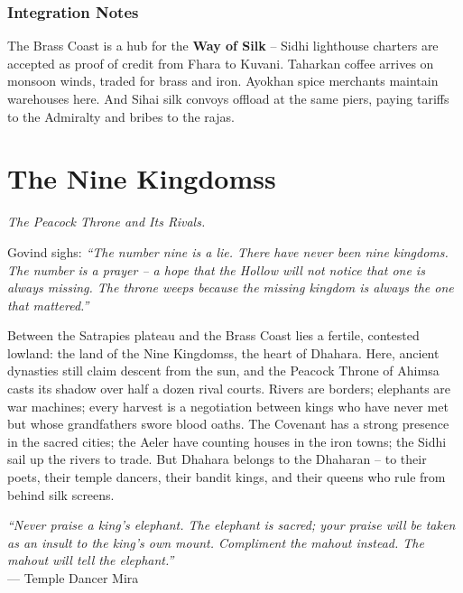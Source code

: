 \documentclass[12pt,oneside]{book}
\begin{document}
\subsection*{Integration Notes}
The Brass Coast is a hub for the \textbf{Way of Silk} -- Sidhi lighthouse charters are accepted as proof of credit from Fhara to Kuvani. Taharkan coffee arrives on monsoon winds, traded for brass and iron. Ayokhan spice merchants maintain warehouses here. And Sihai silk convoys offload at the same piers, paying tariffs to the Admiralty and bribes to the rajas.

\newpage

\newpage

\chapter{The Nine Kingdomss}
\emph{The Peacock Throne and Its Rivals.}

\noindent
Govind sighs: \textit{``The number nine is a lie. There have never been nine kingdoms. The number is a prayer -- a hope that the Hollow will not notice that one is always missing. The throne weeps because the missing kingdom is always the one that mattered.''}

\noindent
Between the Satrapies plateau and the Brass Coast lies a fertile, contested lowland: the land of the Nine Kingdomss, the heart of Dhahara. Here, ancient dynasties still claim descent from the sun, and the Peacock Throne of Ahimsa casts its shadow over half a dozen rival courts. Rivers are borders; elephants are war machines; every harvest is a negotiation between kings who have never met but whose grandfathers swore blood oaths. The Covenant has a strong presence in the sacred cities; the Aeler have counting houses in the iron towns; the Sidhi sail up the rivers to trade. But Dhahara belongs to the Dhaharan -- to their poets, their temple dancers, their bandit kings, and their queens who rule from behind silk screens.

\vspace{0.5em}
\noindent\textit{``Never praise a king's elephant. The elephant is sacred; your praise will be taken as an insult to the king's own mount. Compliment the mahout instead. The mahout will tell the elephant.''} \\
--- Temple Dancer Mira
\end{document}
